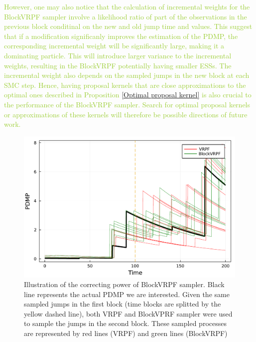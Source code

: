 \documentclass[12pt,a4paper]{article}
\begin{document}
\textcolor{YellowGreen}
{However, one may also notice that the calculation of incremental weights for the BlockVRPF sampler involve a likelihood ratio of part of the observations in the previous block conditinal on the new and old jump time and values. This suggest that if a modification significanly improves the estimation of the PDMP, the corresponding incremental weight will be significantly large, making it a dominating particle. This will introduce larger variance to the incremental weights, resulting in the BlockVRPF potentially having smaller ESSs. The incremental weight also depends on the sampled jumps in the new block at each SMC step. Hence, having proposal kernels that are close approximations to the optimal ones described in Proposition \ref{Optimal proposal kernel} is also crucial to the performance of the BlockVRPF sampler. Search for optimal proposal kernels or approximations of these kernels will therefore be possible directions of future work.}

\begin{figure}[htb!]
    \centering
    \includegraphics[width=\textwidth]{BlockVRPF_Illustration.pdf}
    \caption{Illustration of the correcting power of BlockVRPF sampler. Black line represents the actual PDMP we are interested. Given the same sampled jumps in the first block (time blocks are splitted by the yellow dashed line), both VRPF and BlockVPRF sampler were used to sample the jumps in the second block. These sampled processes are represented by red lines (VRPF) and green lines (BlockVRPF)}
    \label{BlockSMC_correction_illustration}
\end{figure}
\end{document}
